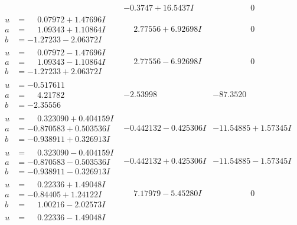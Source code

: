 \documentclass[1p]{elsarticle_modified}
\theoremstyle{definition}
\begin{document}
$$\begin{array}{c|c|c}
 & -0.3747 + 16.5437 I & \phantom{-0.000000 } 0 \\ \hline\begin{aligned}
u &= \phantom{-}0.07972 + 1.47696 I \\
a &= \phantom{-}1.09343 + 1.10864 I \\
b &= -1.27233 - 2.06372 I\end{aligned}
 & \phantom{-}2.77556 + 6.92698 I & \phantom{-0.000000 } 0 \\ \hline\begin{aligned}
u &= \phantom{-}0.07972 - 1.47696 I \\
a &= \phantom{-}1.09343 - 1.10864 I \\
b &= -1.27233 + 2.06372 I\end{aligned}
 & \phantom{-}2.77556 - 6.92698 I & \phantom{-0.000000 } 0 \\ \hline\begin{aligned}
u &= -0.517611\phantom{ +0.000000I} \\
a &= \phantom{-}4.21782\phantom{ +0.000000I} \\
b &= -2.35556\phantom{ +0.000000I}\end{aligned}
 & -2.53998\phantom{ +0.000000I} & -87.3520\phantom{ +0.000000I} \\ \hline\begin{aligned}
u &= \phantom{-}0.323090 + 0.404159 I \\
a &= -0.870583 + 0.503536 I \\
b &= -0.938911 + 0.326913 I\end{aligned}
 & -0.442132 - 0.425306 I & -11.54885 + 1.57345 I \\ \hline\begin{aligned}
u &= \phantom{-}0.323090 - 0.404159 I \\
a &= -0.870583 - 0.503536 I \\
b &= -0.938911 - 0.326913 I\end{aligned}
 & -0.442132 + 0.425306 I & -11.54885 - 1.57345 I \\ \hline\begin{aligned}
u &= \phantom{-}0.22336 + 1.49048 I \\
a &= -0.84405 + 1.24122 I \\
b &= \phantom{-}1.00216 - 2.02573 I\end{aligned}
 & \phantom{-}7.17979 - 5.45280 I & \phantom{-0.000000 } 0 \\ \hline\begin{aligned}
u &= \phantom{-}0.22336 - 1.49048 I \\

\end{aligned}
\end{array}$$
\end{document}
